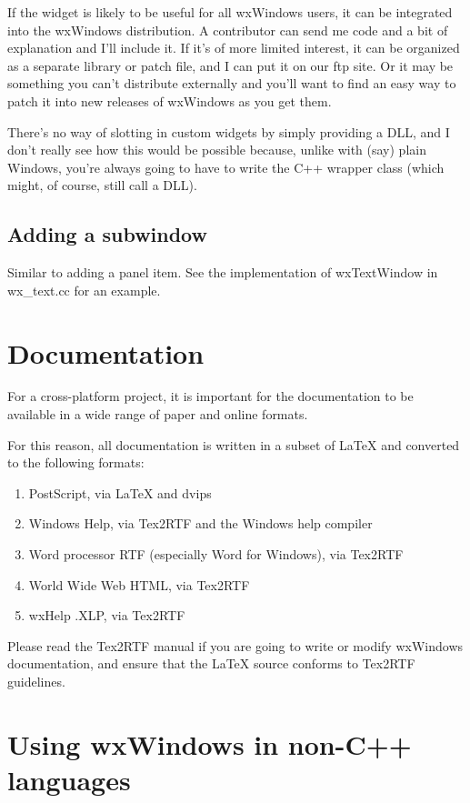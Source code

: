 If the widget is likely to be useful for all wxWindows users, it
can be integrated into the wxWindows distribution. A contributor
can send me code and a bit of explanation and I'll include it.
If it's of more limited interest, it can be organized as a separate
library or patch file, and I can put it on our ftp site. Or it
may be something you can't distribute externally and you'll
want to find an easy way to patch it into new releases of wxWindows
as you get them.

There's no way of slotting in custom widgets by simply providing a DLL,
and I don't really see how this would be possible because, unlike with
(say) plain Windows, you're always going to have to write the C++
wrapper class (which might, of course, still call a DLL).

\section{Adding a subwindow}

Similar to adding a panel item. See the implementation of wxTextWindow
in wx\_text.cc for an example.

\chapter{Documentation}

For a cross-platform project, it is important for the documentation to
be available in a wide range of paper and online formats.

For this reason, all documentation is written in a subset of LaTeX and
converted to the following formats:

\begin{enumerate}\itemsep=0pt
\item PostScript, via LaTeX and dvips
\item Windows Help, via Tex2RTF and the Windows help compiler
\item Word processor RTF (especially Word for Windows), via Tex2RTF
\item World Wide Web HTML, via Tex2RTF
\item wxHelp .XLP, via Tex2RTF
\end{enumerate}

Please read the Tex2RTF manual if you are going to write or modify
wxWindows documentation, and ensure that the LaTeX source conforms
to Tex2RTF guidelines.

\chapter{Using wxWindows in non-C++ languages}

